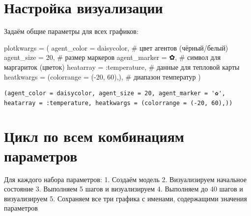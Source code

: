 \documentclass[
  12pt,
  a4paper,
  DIV=11,
  numbers=noendperiod]{scrreprt}
\newenvironment{Shaded}{\begin{snugshade}}{\end{snugshade}}
\newcommand{\CharTok}[1]{\textcolor[rgb]{0.13,0.47,0.30}{#1}}
\newcommand{\CommentTok}[1]{\textcolor[rgb]{0.37,0.37,0.37}{#1}}
\newcommand{\FloatTok}[1]{\textcolor[rgb]{0.68,0.00,0.00}{#1}}
\newcommand{\NormalTok}[1]{\textcolor[rgb]{0.00,0.23,0.31}{#1}}
\newcommand{\OperatorTok}[1]{\textcolor[rgb]{0.37,0.37,0.37}{#1}}
\begin{document}
\section{Настройка
визуализации}\label{ux43dux430ux441ux442ux440ux43eux439ux43aux430-ux432ux438ux437ux443ux430ux43bux438ux437ux430ux446ux438ux438-1}

Задаём общие параметры для всех графиков:

\begin{Shaded}
\begin{Highlighting}[]
\NormalTok{plotkwargs }\OperatorTok{=}\NormalTok{ (}
\NormalTok{    agent\_color }\OperatorTok{=}\NormalTok{ daisycolor,          }\CommentTok{\# цвет агентов (чёрный/белый)}
\NormalTok{    agent\_size }\OperatorTok{=} \FloatTok{20}\NormalTok{,                    }\CommentTok{\# размер маркеров}
\NormalTok{    agent\_marker }\OperatorTok{=} \CharTok{\textquotesingle{}✿\textquotesingle{}}\NormalTok{,                  }\CommentTok{\# символ для маргариток (цветок)}
\NormalTok{    heatarray }\OperatorTok{=} \OperatorTok{:}\NormalTok{temperature,            }\CommentTok{\# данные для тепловой карты}
\NormalTok{    heatkwargs }\OperatorTok{=}\NormalTok{ (colorrange }\OperatorTok{=}\NormalTok{ (}\OperatorTok{{-}}\FloatTok{20}\NormalTok{, }\FloatTok{60}\NormalTok{),),  }\CommentTok{\# диапазон температур}
\NormalTok{)}
\end{Highlighting}
\end{Shaded}

\begin{verbatim}
(agent_color = daisycolor, agent_size = 20, agent_marker = '✿', heatarray = :temperature, heatkwargs = (colorrange = (-20, 60),))
\end{verbatim}

\section{Цикл по всем комбинациям
параметров}\label{ux446ux438ux43aux43b-ux43fux43e-ux432ux441ux435ux43c-ux43aux43eux43cux431ux438ux43dux430ux446ux438ux44fux43c-ux43fux430ux440ux430ux43cux435ux442ux440ux43eux432}

Для каждого набора параметров: 1. Создаём модель 2. Визуализируем
начальное состояние 3. Выполняем 5 шагов и визуализируем 4. Выполняем до
40 шагов и визуализируем 5. Сохраняем все три графика с именами,
содержащими значения параметров
\end{document}
